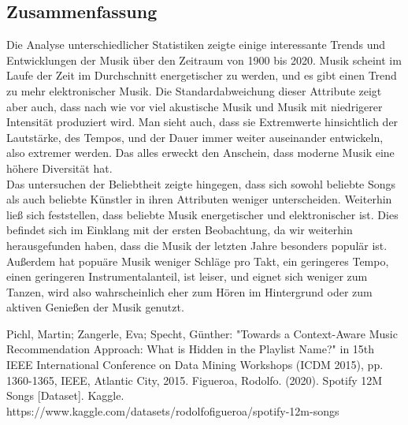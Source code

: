 \documentclass[conference]{IEEEtran}
\begin{document}
\subsection{Zusammenfassung}
Die Analyse unterschiedlicher Statistiken zeigte einige interessante Trends und Entwicklungen der Musik über den Zeitraum von 1900 bis 2020. Musik scheint im Laufe der Zeit im Durchschnitt energetischer zu werden, und es gibt einen Trend zu mehr elektronischer Musik. Die Standardabweichung dieser Attribute zeigt aber auch, dass nach wie vor viel akustische Musik und Musik mit niedrigerer Intensität produziert wird. Man sieht auch, dass sie Extremwerte hinsichtlich der Lautstärke, des Tempos, und der Dauer immer weiter auseinander entwickeln, also extremer werden. Das alles erweckt den Anschein, dass moderne Musik eine höhere Diversität hat. \\
Das untersuchen der Beliebtheit zeigte hingegen, dass sich sowohl beliebte Songs als auch beliebte Künstler in ihren Attributen weniger unterscheiden. Weiterhin ließ sich feststellen, dass beliebte Musik energetischer und elektronischer ist. Dies befindet sich im Einklang mit der ersten Beobachtung, da wir weiterhin herausgefunden haben, dass die Musik der letzten Jahre besonders populär ist. Außerdem hat popuäre Musik weniger Schläge pro Takt, ein geringeres Tempo, einen geringeren Instrumentalanteil, ist leiser, und eignet sich weniger zum Tanzen, wird also wahrscheinlich eher zum Hören im Hintergrund oder zum aktiven Genießen der Musik genutzt. 


\begin{thebibliography}{00}
 Pichl, Martin; Zangerle, Eva; Specht, Günther: "Towards a Context-Aware Music Recommendation Approach: What is Hidden in the Playlist Name?" in 15th IEEE International Conference on Data Mining Workshops (ICDM 2015), pp. 1360-1365, IEEE, Atlantic City, 2015.
 Figueroa, Rodolfo. (2020). Spotify 12M Songs [Dataset]. Kaggle. https://www.kaggle.com/datasets/rodolfofigueroa/spotify-12m-songs
\end{thebibliography}
\vspace{12pt}
\end{document}
